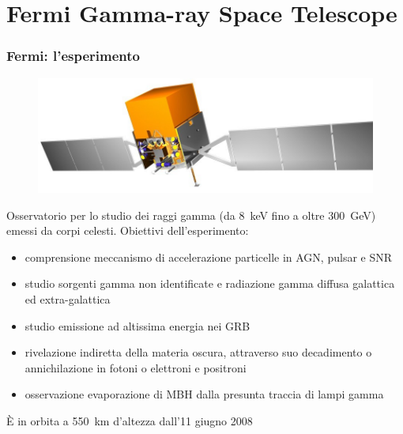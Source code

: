 \documentclass[10pt]{beamer}
\begin{document}
\section[Fermi]{Fermi Gamma-ray Space Telescope}

\begin{frame}
  \frametitle{Fermi: l'esperimento}
  \begin{figure}
    \centering
    \includegraphics[width=0.5\columnwidth]{glast.jpg}
  \end{figure}
  Osservatorio per lo studio dei raggi gamma (da \SI{8}{\kilo\electronvolt} fino
  a oltre \SI{300}{\giga\electronvolt}) emessi da corpi celesti.  Obiettivi
  dell'esperimento:
  \begin{itemize}
  \item comprensione \alert{meccanismo di accelerazione particelle} in AGN,
    pulsar e SNR
  \item studio \alert{sorgenti gamma non identificate} e
    \alert{radiazione gamma diffusa} galattica ed extra-galattica
  \item studio \alert{emissione ad altissima energia} nei GRB
  \item rivelazione indiretta della \alert{materia oscura}, attraverso suo
    decadimento o annichilazione in fotoni o elettroni e positroni
  \item osservazione \alert{evaporazione di MBH} dalla presunta traccia di lampi
    gamma
  \end{itemize}
  È in orbita a \SI{550}{\kilo\metre} d'altezza dall'11 giugno 2008
\end{frame}
\end{document}
